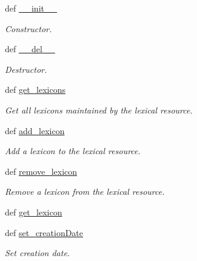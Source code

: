 \begin{DoxyCompactItemize}
\item 
def \hyperlink{classlmf_1_1src_1_1core_1_1lexical__resource_1_1_lexical_resource_a8f7f77cfb5a432a9968844c33e6123a2}{\+\_\+\+\_\+init\+\_\+\+\_\+}
\begin{DoxyCompactList}\small\item\em Constructor. \end{DoxyCompactList}\item 
def \hyperlink{classlmf_1_1src_1_1core_1_1lexical__resource_1_1_lexical_resource_ae39531404208c5fdb20f431d7949568f}{\+\_\+\+\_\+del\+\_\+\+\_\+}
\begin{DoxyCompactList}\small\item\em Destructor. \end{DoxyCompactList}\item 
def \hyperlink{classlmf_1_1src_1_1core_1_1lexical__resource_1_1_lexical_resource_a6294a827ab54971b60c5843cb69d379c}{get\+\_\+lexicons}
\begin{DoxyCompactList}\small\item\em Get all lexicons maintained by the lexical resource. \end{DoxyCompactList}\item 
def \hyperlink{classlmf_1_1src_1_1core_1_1lexical__resource_1_1_lexical_resource_a64ea1ed8f75c1aee5a2ff07786d81851}{add\+\_\+lexicon}
\begin{DoxyCompactList}\small\item\em Add a lexicon to the lexical resource. \end{DoxyCompactList}\item 
def \hyperlink{classlmf_1_1src_1_1core_1_1lexical__resource_1_1_lexical_resource_a7b823f2fc2470472980e061420799c3f}{remove\+\_\+lexicon}
\begin{DoxyCompactList}\small\item\em Remove a lexicon from the lexical resource. \end{DoxyCompactList}\item 
def \hyperlink{classlmf_1_1src_1_1core_1_1lexical__resource_1_1_lexical_resource_a83880e971a7137cd9b0599bd056702a1}{get\+\_\+lexicon}
\item 
def \hyperlink{classlmf_1_1src_1_1core_1_1lexical__resource_1_1_lexical_resource_a32872ca39f2aeb0d87e59bd89079033d}{set\+\_\+creation\+Date}
\begin{DoxyCompactList}\small\item\em Set creation date. \end{DoxyCompactList}\item 

\end{DoxyCompactItemize}

